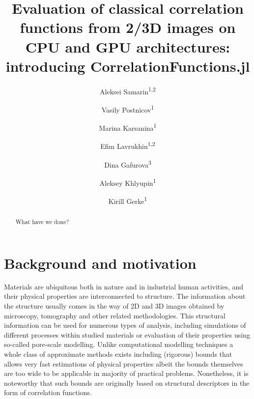 \documentclass[reprint,amsmath,amssymb,aps,pre,showkeys,showpacs,nofootinbib]{revtex4-1}
\begin{document}

\author{Aleksei Samarin\textsuperscript{1,2}}
\author{Vasily Postnicov\textsuperscript{1}}
\author{Marina Karsanina\textsuperscript{1}}
\author{Efim Lavrukhin\textsuperscript{1,2}}
\author{Dina Gafurova\textsuperscript{3}}
\author{Aleksey Khlyupin\textsuperscript{1}}
\author{Kirill Gerke\textsuperscript{1}}


\title{Evaluation of classical correlation functions from 2/3D images on CPU and
  GPU architectures: introducing CorrelationFunctions.jl}

\begin{abstract}
  What have we done?
\end{abstract}

\maketitle

\section{Background and motivation}
\label{sec:background}
Materials are ubiquitous both in nature and in industrial human activities, and
their physical properties are interconnected to
structure\cite{Torquato_book}\cite{Sahimi_book}\cite{Adler_recon}. The information
about the structure usually comes in the way of 2D and 3D images obtained by
microscopy, tomography and other related methodologies. This structural
information can be used for numerous types of analysis, including simulations of
different processes within studied materials or evaluation of their properties
using so-called pore-scale modelling. Unlike computational modelling techniques
a whole class of approximate methods exists including (rigorous) bounds that
allows very fast estimations of physical properties albeit the bounds themselves
are too wide to be applicable in majority of practical problems. Nonetheless, it
is noteworthy that such bounds are originally based on structural descriptors in
the form of correlation functions.
\end{document}
